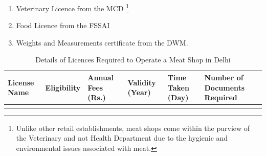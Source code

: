 \documentclass[a4paper, 12pt]{article}
\begin{document}
\begin{enumerate}
\item Veterinary Licence from the MCD \footnote{ Unlike other retail establishments, meat shops come within the purview of the Veterinary and not Health Department due to the hygienic and environmental issues associated with meat.}
\item Food Licence from the FSSAI
\item Weights and Measurements certificate from the DWM.
\end{enumerate}

\begin{longtable}{>{\raggedright}p{2.5cm}>{\raggedright}p{2.5cm}>{\raggedright}p{2.5cm}>{\raggedright}p{2.5cm}>{\raggedright}p{2.5cm}>{\raggedright\arraybackslash}p{2.5cm}}
\caption{Details of Licences Required to Operate a Meat Shop in Delhi} \\
License Name & Eligibility & Annual Fees (Rs.) & Validity (Year) & Time Taken (Day) & Number of Documents Required \\
\midrule
\endfirsthead
\endhead
\midrule
\endlastfoot


\end{longtable}
\end{document}

